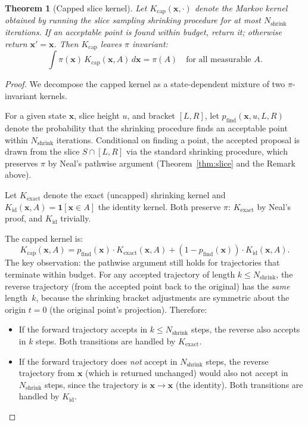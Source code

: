 \documentclass[12pt]{article}
\newtheorem{theorem}{Theorem}
\newcommand{\bx}{\mathbf{x}}
\begin{document}
\begin{theorem}[Capped slice kernel]
\label{thm:capped}
Let $K_{\mathrm{cap}}(\bx, \cdot)$ denote the Markov kernel obtained
by running the slice sampling shrinking procedure for at most
$N_{\mathrm{shrink}}$ iterations. If an acceptable point is found
within budget, return it; otherwise return $\bx' = \bx$. Then
$K_{\mathrm{cap}}$ leaves $\pi$ invariant:
\[
    \int \pi(\bx)\, K_{\mathrm{cap}}(\bx, A)\, d\bx = \pi(A)
    \quad \text{for all measurable } A.
\]
\end{theorem}

\begin{proof}
We decompose the capped kernel as a state-dependent mixture of two
$\pi$-invariant kernels.

For a given state $\bx$, slice height $u$, and bracket $[L, R]$, let
$p_{\mathrm{find}}(\bx, u, L, R)$ denote the probability that the
shrinking procedure finds an acceptable point within
$N_{\mathrm{shrink}}$ iterations. Conditional on finding a point, the
accepted proposal is drawn from the slice $S \cap [L, R]$ via the
standard shrinking procedure, which preserves $\pi$ by Neal's pathwise
argument (Theorem~\ref{thm:slice} and the Remark above).

Let $K_{\mathrm{exact}}$ denote the exact (uncapped) shrinking kernel
and $K_{\mathrm{id}}(\bx, A) = \mathbf{1}[\bx \in A]$ the identity
kernel. Both preserve $\pi$: $K_{\mathrm{exact}}$ by Neal's proof, and
$K_{\mathrm{id}}$ trivially.

The capped kernel is:
\[
    K_{\mathrm{cap}}(\bx, A)
    = p_{\mathrm{find}}(\bx) \cdot K_{\mathrm{exact}}(\bx, A)
    + (1 - p_{\mathrm{find}}(\bx)) \cdot K_{\mathrm{id}}(\bx, A).
\]
The key observation: the pathwise argument still holds for trajectories
that terminate within budget. For any accepted trajectory of length
$k \leq N_{\mathrm{shrink}}$, the reverse trajectory (from the
accepted point back to the original) has the \emph{same} length~$k$,
because the shrinking bracket adjustments are symmetric about the
origin $t = 0$ (the original point's projection). Therefore:
\begin{itemize}
    \item If the forward trajectory accepts in $k \leq N_{\mathrm{shrink}}$
    steps, the reverse also accepts in $k$ steps. Both transitions are
    handled by $K_{\mathrm{exact}}$.
    \item If the forward trajectory does \emph{not} accept in
    $N_{\mathrm{shrink}}$ steps, the reverse trajectory from $\bx$
    (which is returned unchanged) would also not accept in
    $N_{\mathrm{shrink}}$ steps, since the trajectory is $\bx \to \bx$
    (the identity). Both transitions are handled by $K_{\mathrm{id}}$.
\end{itemize}


\end{proof}
\end{document}
